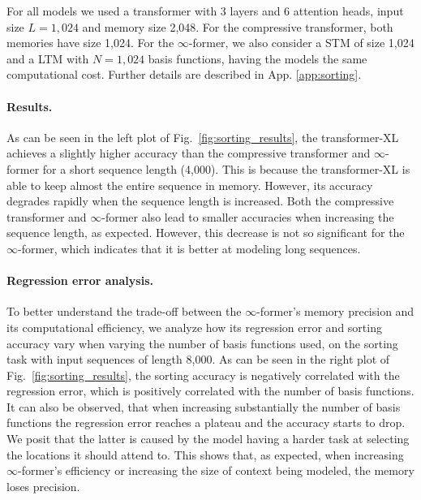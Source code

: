\documentclass[11pt]{article}
\begin{document}
For all models we used a transformer with 3 layers and 6 attention heads, input size $L=1,024$ and memory size 2,048. For the compressive transformer, both memories have size 1,024. For the \mbox{$\infty$-former}, we also consider a STM of size 1,024 and a LTM with $N=1,024$ basis functions, having the models the same computational cost.
Further details are described in App. \ref{app:sorting}.

\paragraph{Results. }
As can be seen in the left plot of Fig.~\ref{fig:sorting_results}, the transformer-XL achieves a slightly higher accuracy than the compressive transformer and  \mbox{$\infty$-former} for a short sequence length (4,000). This is because the transformer-XL is able to keep almost the entire sequence in memory.
However, its accuracy degrades rapidly when the sequence length is increased. 
Both the compressive transformer and \mbox{$\infty$-former} also lead to smaller accuracies when increasing the sequence length, as expected. However, this decrease is not so significant for the \mbox{$\infty$-former}, which indicates that it is better at modeling long sequences.

\paragraph{Regression error analysis. }
To better understand the trade-off between the \mbox{$\infty$-former}'s memory precision and its computational efficiency, we analyze how its regression error and sorting accuracy vary when varying the number of basis functions used, on the sorting task with input sequences of length 8,000. 
As can be seen in the right plot of Fig.~\ref{fig:sorting_results}, the sorting accuracy is negatively correlated with the regression error, which is positively correlated with the number of basis functions.
It can also be observed, that when increasing substantially the number of basis functions the regression error reaches a plateau and the accuracy starts to drop. We posit that the latter is caused by the model having a harder task at selecting the locations it should attend to. 
This shows that, as expected, when increasing \mbox{$\infty$-former}'s efficiency or increasing the size of context being modeled, the memory loses precision.
\end{document}
